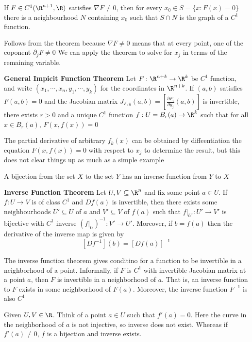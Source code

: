 \documentclass[11pt]{article}
\begin{document}
\begin{corollary*}
   If $F\in C^1(\R^{n+1}, \R)$ satisfies $\nabla F\neq 0$, then for every $x_0\in S = \{ x: F(x) = 0\}$ there is a neighbourhood $N$ containing $x_0$ such that $S\cap N$ is the graph of a $C^1$ function.
   \begin{rem}
     Follows from the theorem because $\nabla F\neq 0$ means that at every point, one of the coponent $\partial_j F\neq 0$ We can apply the theorem to solve for $x_j$ in terms of the remaining variable.
   \end{rem}
\end{corollary*}

\begin{theorem*}
  \textbf{General Impicit Function Theorem} Let $F: \R^{n+k} \to\R^k$ be $C^1$ function, and write $(x_1, \cdots, x_n, y_1, \cdots, y_k)$ for the coordinates in $\R^{n+k}$. If $(a,b)$ satisfies $F(a,b) = 0$ and the Jacobian matrix  $J_{F,y} (a,b)= [\frac{\partial F_i}{\partial y_j}(a,b)]$ is invertible, there exists $r > 0$ and a unique $C^1$ function $f: U = B_r(a)\to\R^k$ such that for all $x\in B_r(a)$, $F(x, f(x)) = 0$

  \begin{rem}
    The partial derivative of arbitrary $f_k(x)$ can be obtained by diffeentiation the equation $F(x, f(x))=0$ with respect to $x_j$ to determine the result, but this does not clear things up as much as a simple example
  \end{rem}
\end{theorem*}


\begin{defn*}
  A bijection from the set $X$ to the set $Y$ has an inverse function from $Y$ to $X$
\end{defn*}

\begin{theorem*}
  \textbf{Inverse Function Theorem} Let $U,V\subseteq \R^n$ and fix some point $a\in U$. If $f: U\to V$ is of class $C^1$ and $Df(a)$ is invertible, then there exists some neighbourhoods $U' \subseteq U$ of $a$ and $V' \subseteq V$ of $f(a)$ such that $f|_{U'}: U' \to V'$ is bijective with $C^1$ inverse $(f|_{U})^{-1}: V' \to U'$. Moreover, if $b = f(a)$ then the derivative of the inverse map is given by
  \[
    [Df^{-1}](b) = [Df(a)]^{-1}
  \]
  \begin{rem}
    The inverse function theorem gives conditino for a function to be invertible in a neighborhood of a point. Informally, if $F$ is $C^1$ with invertible Jacobian matrix at a point $a$, then $F$ is invertible in a neighborhood of $a$. That is, an inverse function to $F$ exists in some neighborhood of $F(a)$. Moreover, the inverse function $F^{-1}$ is also $C^1$
  \end{rem}
  \begin{rem}
    Given $U,V\in\R$. Think of a point $a\in U$ such that $f'(a) = 0$. Here the curve in the neighborhood of $a$ is not injective, so inverse does not exist. Whereas if $f'(a) \neq 0$, $f$ is a bijection and inverse exists.
  \end{rem}
\end{theorem*}
\end{document}
